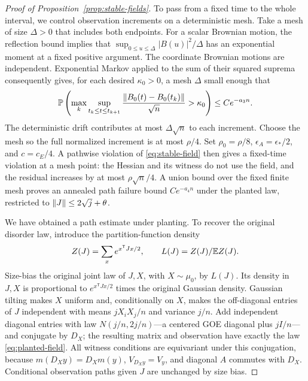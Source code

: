 \begin{proof}[Proof of Proposition~\ref{prop:stable-fields}]
To pass from a fixed time to the whole interval, we control observation
increments on a deterministic mesh. Take a mesh of size $\Delta>0$
that includes both endpoints.  For a scalar
Brownian motion, the reflection bound implies that
$\sup_{0\le u\le\Delta}|B(u)|^2/\Delta$ has an exponential moment
at a fixed positive argument.  The coordinate Brownian motions are
independent.  Exponential Markov applied to the sum of their squared
suprema consequently gives, for each desired $\kappa_0>0$, a mesh
$\Delta$ small enough that
\[
 \mathbb P\left(\max_k\sup_{t_k\le t\le t_{k+1}}
       \frac{\lVert B_0(t)-B_0(t_k)\rVert}{\sqrt n}>\kappa_0\right)
 \le Ce^{-a_3n}.
\]
The deterministic drift contributes at most $\Delta\sqrt n$ to each
increment.  Choose the mesh so the full normalized increment is at
most $\rho/4$.  Set $\rho_0=\rho/8$,
$\epsilon_A=\epsilon_*/2$, and $c=c_E/4$.  A pathwise violation of
\eqref{eq:stable-field} then gives a fixed-time violation at a mesh
point: the Hessian and its witness do not use the field, and the
residual increases by at most $\rho\sqrt n/4$.  A union bound over
the fixed finite mesh proves an annealed path failure bound
$Ce^{-a_4n}$ under the planted law, restricted to
$\lVert J\rVert\le2\sqrt j+\theta$.

We have obtained a path estimate under planting. To recover the
original disorder law, introduce the partition-function density
\[
 Z(J)=\sum_x e^{x^{\mathsf T}Jx/2},\qquad
 L(J)=Z(J)/\mathbb E Z(J).
\]
Size-bias the original joint law of $J,X$, with $X\sim\mu_0$, by
$L(J)$.  Its density in $J,X$ is proportional to
$e^{x^{\mathsf T}Jx/2}$ times the original Gaussian density.
Gaussian tilting makes $X$ uniform and, conditionally on $X$, makes
the off-diagonal entries of $J$ independent with means
$jX_iX_j/n$ and variance $j/n$.  Add independent diagonal entries with law $N(j/n,2j/n)$---a centered
GOE diagonal plus $jI/n$---and conjugate by $D_X$; the resulting matrix and observation have exactly
the law \eqref{eq:planted-field}.  All witness conditions are
equivariant under this conjugation, because $m(D_Xy)=D_Xm(y)$,
$V_{D_Xy}=V_y$, and diagonal $A$ commutes with $D_X$.  Conditional
observation paths given $J$ are unchanged by size bias.


\end{proof}
